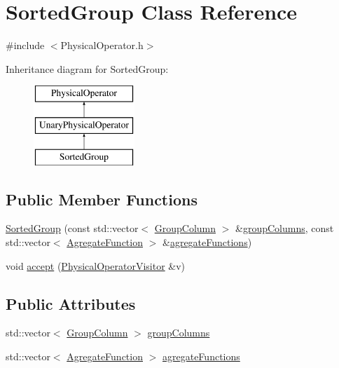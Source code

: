 \hypertarget{class_sorted_group}{\section{Sorted\+Group Class Reference}
\label{class_sorted_group}
}


{\ttfamily \#include $<$Physical\+Operator.\+h$>$}

Inheritance diagram for Sorted\+Group\+:\begin{figure}[H]
\begin{center}
\leavevmode
\includegraphics[height=3.000000cm]{class_sorted_group}
\end{center}
\end{figure}
\subsection*{Public Member Functions}
\begin{DoxyCompactItemize}
\item 
\hyperlink{class_sorted_group_a5f6798dee7afc557e3510b32558cab05}{Sorted\+Group} (const std\+::vector$<$ \hyperlink{class_group_column}{Group\+Column} $>$ \&\hyperlink{class_sorted_group_af4ccedafc52d06be95d88eec6e235ba2}{group\+Columns}, const std\+::vector$<$ \hyperlink{class_agregate_function}{Agregate\+Function} $>$ \&\hyperlink{class_sorted_group_ab3d59776a6c7516df046d09b0bcd2f4e}{agregate\+Functions})
\item 
void \hyperlink{class_sorted_group_aba97fdc1722858dc33723052e6bc7e5a}{accept} (\hyperlink{class_physical_operator_visitor}{Physical\+Operator\+Visitor} \&v)
\end{DoxyCompactItemize}
\subsection*{Public Attributes}
\begin{DoxyCompactItemize}
\item 
std\+::vector$<$ \hyperlink{class_group_column}{Group\+Column} $>$ \hyperlink{class_sorted_group_af4ccedafc52d06be95d88eec6e235ba2}{group\+Columns}
\item 
std\+::vector$<$ \hyperlink{class_agregate_function}{Agregate\+Function} $>$ \hyperlink{class_sorted_group_ab3d59776a6c7516df046d09b0bcd2f4e}{agregate\+Functions}
\end{DoxyCompactItemize}


